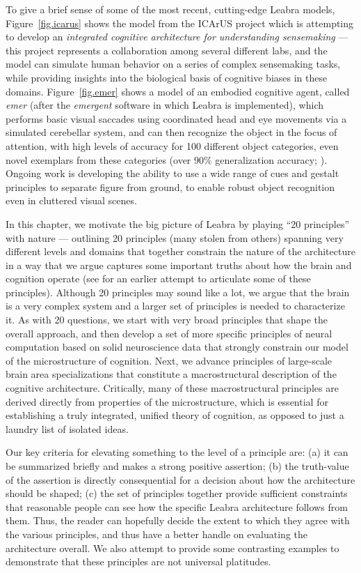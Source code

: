 \documentclass[11pt,twoside]{article}
\begin{document}
To give a brief sense of some of the most recent, cutting-edge Leabra models, Figure~\ref{fig.icarus} shows the model from the ICArUS project which is attempting to develop an {\em integrated cognitive architecture for understanding sensemaking} --- this project represents a collaboration among several different labs, and the model can simulate human behavior on a series of complex sensemaking tasks, while providing insights into the biological basis of cognitive biases in these domains.  Figure~\ref{fig.emer} shows a model of an embodied cognitive agent, called {\em emer} (after the {\em emergent} software in which Leabra is implemented), which performs basic visual saccades using coordinated head and eye movements via a simulated cerebellar system, and can then recognize the object in the focus of attention, with high levels of accuracy for 100 different object categories, even novel exemplars from these categories (over 90\% generalization accuracy; \cite{OReillyEtAlLvis}).  Ongoing work is developing the ability to use a wide range of cues and gestalt principles to separate figure from ground, to enable robust object recognition even in cluttered visual scenes.

In this chapter, we motivate the big picture of Leabra by playing ``20 principles'' with nature --- outlining 20 principles (many stolen from others) spanning very different levels and domains that together constrain the nature of the architecture in a way that we argue captures some important truths about how the brain and cognition operate (see  for an earlier attempt to articulate some of these principles).  Although 20 principles may sound like a lot, we argue that the brain is a very complex system and a larger set of principles is needed to characterize it.  As with 20 questions, we start with very broad principles that shape the overall approach, and then develop a set of more specific principles of neural computation based on solid neuroscience data that strongly constrain our model of the microstructure of cognition.  Next, we advance principles of large-scale brain area specializations that constitute a macrostructural description of the cognitive architecture.  Critically, many of these macrostructural principles are derived directly from properties of the microstructure, which is essential for establishing a truly integrated, unified theory of cognition, as opposed to just a laundry list of isolated ideas.

Our key criteria for elevating something to the level of a principle are: (a) it can be summarized briefly and makes a strong positive assertion; (b) the truth-value of the assertion is directly consequential for a decision about how the architecture should be shaped; (c) the set of principles together provide sufficient constraints that reasonable people can see how the specific Leabra architecture follows from them.  Thus, the reader can hopefully decide the extent to which they agree with the various principles, and thus have a better handle on evaluating the architecture overall.  We also attempt to provide some contrasting examples to demonstrate that these principles are not universal platitudes.
\end{document}
